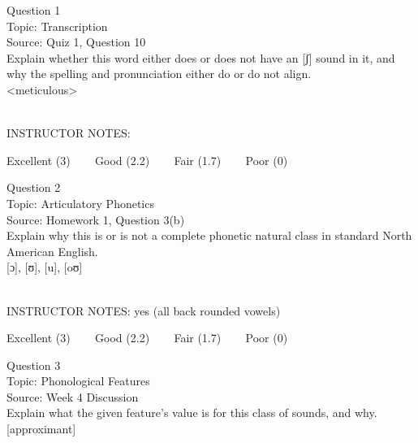 \documentclass[12pt]{article}
\begin{document}
\begin{center}
\textbf{{\color{blue}{\HUGE START OF EXAM\\}}}

\textbf{{\color{blue}{\HUGE Student ID: 13570\\}}}

\textbf{{\color{blue}{\HUGE \\}}}

\end{center}
\newpage

{\large Question 1}\\

Topic: Transcription\\
Source: Quiz 1, Question 10\\

Explain whether this word either does or does not have an [ʃ] sound in it, and why the spelling and pronunciation either do or do not align.\\

<meticulous>


~\\
INSTRUCTOR NOTES: 


\vfill
Excellent (3) ~~~ Good (2.2) ~~~ Fair (1.7) ~~~ Poor (0)
\newpage

{\large Question 2}\\

Topic: Articulatory Phonetics\\
Source: Homework 1, Question 3(b)\\

Explain why this is or is not a complete phonetic natural class in standard North American English.\\

{[ɔ]}, {[ʊ]}, {[u]}, {[oʊ]}


~\\
INSTRUCTOR NOTES: yes (all back rounded vowels)


\vfill
Excellent (3) ~~~ Good (2.2) ~~~ Fair (1.7) ~~~ Poor (0)
\newpage

{\large Question 3}\\

Topic: Phonological Features\\
Source: Week 4 Discussion\\

Explain what the given feature’s value is for this class of sounds, and why.\\

{[approximant]}
\end{document}
